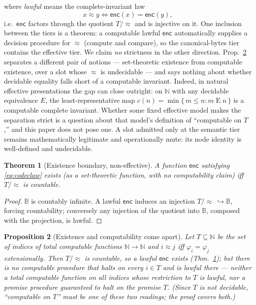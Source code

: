 \documentclass[11pt]{article}
\newtheorem{theorem}{Theorem}[section]
\newtheorem{proposition}[theorem]{Proposition}
\theoremstyle{definition}
\newcommand{\Bytes}{\mathbb{B}}                    %
\newcommand{\enc}{\mathsf{enc}}
\begin{document}
\noindent where \emph{lawful} means the complete-invariant law
\begin{equation}\label{eq:codeclaw}
x \approx y \iff \enc(x) = \enc(y),
\end{equation}
i.e.\ $\enc$ factors through the quotient $T/\!\approx$ and is injective on it. One
inclusion between the tiers is a theorem: a computable lawful $\enc$ automatically
supplies a decision procedure for $\approx$ (compute and compare), so the
canonical-bytes tier contains the effective tier. We claim \emph{no} strictness in
the other direction. Prop.~\ref{prop:gap} separates a different pair of notions ---
set-theoretic existence from computable existence, over a slot whose $\approx$ is
undecidable --- and says nothing about whether decidable equality falls short of a
computable invariant. Indeed, in natural effective presentations the gap can close
outright: on $\mathbb{N}$ with any decidable equivalence $E$, the least-representative
map $c(n) = \min\{\, m \le n : m \mathrel{E} n \,\}$ is a computable complete
invariant. Whether some fixed effective model makes the separation strict is a
question about that model's definition of ``computable on $T$,'' and this paper does
not pose one. A slot admitted only at the semantic tier remains mathematically
legitimate and operationally mute: its node identity is well-defined and
undecidable.

\begin{theorem}[Existence boundary, non-effective]\label{thm:countable}
A function $\enc$ satisfying \eqref{eq:codeclaw} exists (as a set-theoretic function,
with no computability claim) iff $T/\!\approx$ is countable.
\end{theorem}

\begin{proof}
$\Bytes$ is countably infinite. A lawful $\enc$ induces an injection
$T/\!\approx\ \hookrightarrow \Bytes$, forcing countability; conversely any injection
of the quotient into $\Bytes$, composed with the projection, is lawful.
\end{proof}

\begin{proposition}[Existence and computability come apart]\label{prop:gap}
Let $T \subseteq \mathbb{N}$ be the set of indices of total computable functions
$\mathbb{N} \to \mathbb{N}$ and $i \approx j$ iff $\varphi_i = \varphi_j$
extensionally. Then $T/\!\approx$ is countable, so a lawful $\enc$ exists
(Thm.~\ref{thm:countable}); but there is no computable procedure that halts on every
$i \in T$ and is lawful there --- neither a total computable function on all indices
whose restriction to $T$ is lawful, nor a promise procedure guaranteed to halt on the
promise $T$. (Since $T$ is not decidable, ``computable on $T$'' must be one of these
two readings; the proof covers both.)
\end{proposition}
\end{document}
